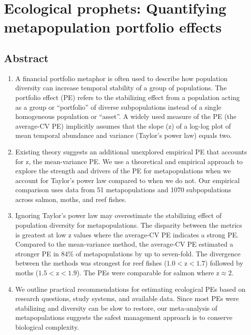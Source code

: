 \chapter[Quantifying metapopulation portfolio effects]{Ecological
  prophets: Quantifying metapopulation portfolio effects\footnotemark[1]}

\section{Abstract}
\begin{enumerate}
 \item A financial portfolio metaphor is often used to describe how population
   diversity can increase temporal stability of a group of populations. The
   portfolio effect (PE) refers to the stabilizing effect from a population
   acting as a group or ``portfolio'' of diverse subpopulations instead of a
   single homogeneous population or ``asset''. A widely used measure of the PE
   (the average-CV PE) implicitly assumes that the slope (z) of a log-log plot
   of mean temporal abundance and variance (Taylor's power law) equals two.

 \item Existing theory suggests an additional unexplored empirical PE that
   accounts for z, the mean-variance PE. We use a theoretical and empirical
   approach to explore the strength and drivers of the PE for metapopulations
   when we account for Taylor's power law compared to when we do not. Our
   empirical comparison uses data from 51 metapopulations and
   1070 subpopulations across salmon, moths, and reef fishes.

 \item Ignoring Taylor's power law may overestimate the stabilizing effect of
   population diversity for metapopulations. The disparity between the metrics
   is greatest at low z values where the average-CV PE indicates a strong PE.
   Compared to the mean-variance method, the average-CV PE estimated a stronger
   PE in 84\% of metapopulations by up to seven-fold. The divergence between
   the methods was strongest for reef fishes ($1.0 < \text{z} < 1.7$) followed
   by moths ($1.5 < \text{z} < 1.9$). The PEs were comparable for salmon where
   $\text{z} \approx 2$.

 \item We outline practical recommendations for estimating ecological PEs based
   on research questions, study systems, and available data. Since most PEs
   were stabilizing and diversity can be slow to restore, our meta-analysis of
   metapopulations suggests the safest management approach is to conserve
   biological complexity.

\end{enumerate}

